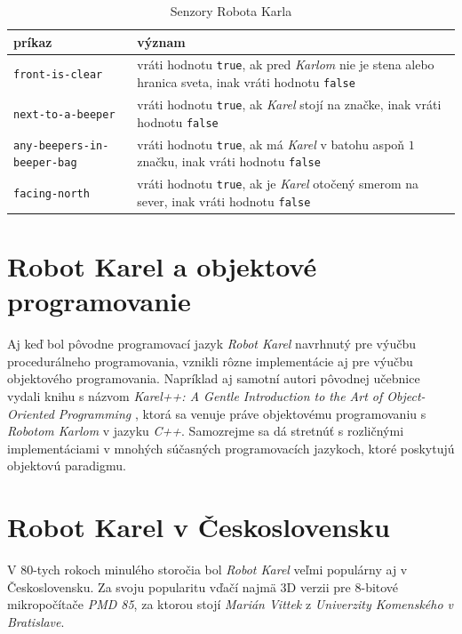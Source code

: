 \begin{table}[!ht]
	\caption{Senzory Robota Karla}\label{tab:karels_sensors}
	\smallskip
	\centering

   \begin{tabular}{l|p{80mm}}
		\toprule
		príkaz & význam \\
		\midrule

		\verb|front-is-clear| & vráti hodnotu \verb|true|, ak pred \emph{Karlom} nie je stena alebo hranica sveta, inak vráti hodnotu \verb|false| \\
		\verb|next-to-a-beeper| & vráti hodnotu \verb|true|, ak \emph{Karel} stojí na značke, inak vráti hodnotu \verb|false| \\
		\verb|any-beepers-in-beeper-bag| & vráti hodnotu \verb|true|, ak má \emph{Karel} v batohu aspoň $1$ značku, inak vráti hodnotu \verb|false| \\
		\verb|facing-north| & vráti hodnotu \verb|true|, ak je \emph{Karel} otočený smerom na sever, inak vráti hodnotu \verb|false| \\
		\bottomrule
	\end{tabular}
\end{table}


\section{Robot Karel a objektové programovanie}

Aj keď bol pôvodne programovací jazyk \emph{Robot Karel} navrhnutý pre výučbu procedurálneho programovania, vznikli rôzne implementácie aj pre výučbu objektového programovania. Napríklad aj samotní autori pôvodnej učebnice vydali knihu s názvom \emph{Karel++: A Gentle Introduction to the Art of Object-Oriented Programming} \cite{Pattis1996}, ktorá sa venuje práve objektovému programovaniu s \emph{Robotom Karlom} v jazyku \emph{C++}. Samozrejme sa dá stretnúť s rozličnými implementáciami v mnohých súčasných programovacích jazykoch, ktoré poskytujú objektovú paradigmu.




\section{Robot Karel v Československu}

V 80-tych rokoch minulého storočia bol \emph{Robot Karel} veľmi populárny aj v Československu. Za svoju popularitu vďačí najmä 3D verzii pre 8-bitové mikropočítače \emph{PMD 85}, za ktorou stojí \emph{Marián Vittek} z \emph{Univerzity Komenského v Bratislave}.

